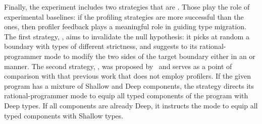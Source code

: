  Finally, the experiment includes two strategies that are \agnostickw{}.
 Those play the role of experimental baselines: if the profiling
 strategies are more successful than the \agnostickw{} ones, then profiler
 feedback plays a meaningful role in guiding type migration.  The first
 \agnostickw{} strategy, \randkw{}, aims to invalidate the null
 hypothesis: it picks at random  a boundary with types of different
 strictness, and suggests to its rational-programmer mode to modify the
 two sides of the target boundary either in an \optkw{} or \conkw{}
 manner.  The second \agnostickw{} strategy, \togglekw{}, was proposed
 by~\citep{g-deep-shallow} and serves as a point of comparison with that previous
 work that does not employ profilers. If the given program has a mixture
 of Shallow and Deep components, the strategy directs its
 rational-programmer mode to equip all typed components of the program
 with Deep types. If all components are already Deep, it instructs the
 mode to equip all typed components with Shallow types. 

